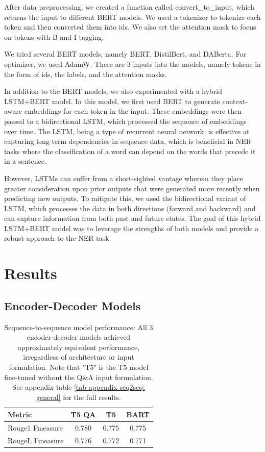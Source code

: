 \documentclass[11pt]{article}
\begin{document}
After data preprocessing, we created a function called convert\_to\_input, which returns the input to different BERT models. We used a tokenizer to tokenize each token and then converted them into ids. We also set the attention mask to focus on tokens with B and I tagging.

We tried several BERT models, namely BERT, DistilBert, and DABerta. For optimizer, we used AdamW. There are 3 inputs into the models, namely tokens in the form of ids, the labels, and the attention masks.

In addition to the BERT models, we also experimented with a hybrid LSTM+BERT model. In this model, we first used BERT to generate context-aware embeddings for each token in the input. These embeddings were then passed to a bidirectional LSTM, which processed the sequence of embeddings over time. The LSTM, being a type of recurrent neural network, is effective at capturing long-term dependencies in sequence data, which is beneficial in NER tasks where the classification of a word can depend on the words that precede it in a sentence.

However, LSTMs can suffer from a short-sighted vantage wherein they place greater consideration upon prior outputs that were generated more recently when predicting new outputs. To mitigate this, we used the bidirectional variant of LSTM, which processes the data in both directions (forward and backward) and can capture information from both past and future states. The goal of this hybrid LSTM+BERT model was to leverage the strengths of both models and provide a robust approach to the NER task.

\section{Results}

\subsection{Encoder-Decoder Models}

\begin{table}[]
\begin{tabular}{l c c c}
\hline
\textbf{Metric} & \textbf{T5 QA} & \textbf{T5} & \textbf{BART}\\
\hline
Rouge1 Fmeasure & 0.780 & 0.775 & 0.775\\
RougeL Fmeasure & 0.776 & 0.772 & 0.771\\
\hline
\end{tabular}

\caption{Sequence-to-sequence model performance: All 3 encoder-decoder models achieved approximately equivalent performance, irregardless of architecture or input formulation. Note that "T5" is the T5 model fine-tuned without the Q\&A input formulation. See appendix table-\ref{tab appendix seq2seq: general} for the full results.}
\label{tab seq2seq: general}
\end{table}
\end{document}
